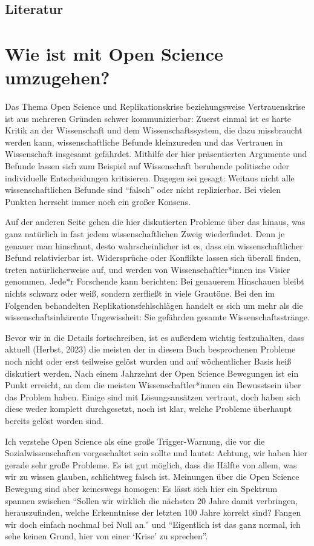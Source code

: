 \documentclass[
  letterpaper,
  DIV=11,
  numbers=noendperiod]{scrreprt}
\begin{document}
\section{Literatur}\label{literatur-2}

\chapter{Wie ist mit Open Science
umzugehen?}\label{wie-ist-mit-open-science-umzugehen}

Das Thema Open Science und Replikationskrise beziehungsweise
Vertrauenskrise ist aus mehreren Gründen schwer kommunizierbar: Zuerst
einmal ist es harte Kritik an der Wissenschaft und dem
Wissenschaftssystem, die dazu missbraucht werden kann, wissenschaftliche
Befunde kleinzureden und das Vertrauen in Wissenschaft insgesamt
gefährdet. Mithilfe der hier präsentierten Argumente und Befunde lassen
sich zum Beispiel auf Wissenschaft beruhende politische oder
individuelle Entscheidungen kritisieren. Dagegen sei gesagt: Weitaus
nicht alle wissenschaftlichen Befunde sind ``falsch'' oder nicht
replizierbar. Bei vielen Punkten herrscht immer noch ein großer Konsens.

Auf der anderen Seite gehen die hier diskutierten Probleme über das
hinaus, was ganz natürlich in fast jedem wissenschaftlichen Zweig
wiederfindet. Denn je genauer man hinschaut, desto wahrscheinlicher ist
es, dass ein wissenschaftlicher Befund relativierbar ist. Widersprüche
oder Konflikte lassen sich überall finden, treten natürlicherweise auf,
und werden von Wissenschaftler*innen ins Visier genommen. Jede*r
Forschende kann berichten: Bei genauerem Hinschauen bleibt nichts
schwarz oder weiß, sondern zerfließt in viele Grautöne. Bei den im
Folgenden behandelten Replikationsfehlschlägen handelt es sich um mehr
als die wissenschaftsinhärente Ungewissheit: Sie gefährden gesamte
Wissenschaftsstränge.

Bevor wir in die Details fortschreiben, ist es außerdem wichtig
festzuhalten, dass aktuell (Herbst, 2023) die meisten der in diesem Buch
besprochenen Probleme noch nicht oder erst teilweise gelöst wurden und
auf wöchentlicher Basis heiß diskutiert werden. Nach einem Jahrzehnt der
Open Science Bewegungen ist ein Punkt erreicht, an dem die meisten
Wissenschaftler*innen ein Bewusstsein über das Problem haben. Einige
sind mit Lösungsansätzen vertraut, doch haben sich diese weder komplett
durchgesetzt, noch ist klar, welche Probleme überhaupt bereits gelöst
worden sind.

Ich verstehe Open Science als eine große Trigger-Warnung, die vor die
Sozialwissenschaften vorgeschaltet sein sollte und lautet: Achtung, wir
haben hier gerade sehr große Probleme. Es ist gut möglich, dass die
Hälfte von allem, was wir zu wissen glauben, schlichtweg falsch ist.
Meinungen über die Open Science Bewegung sind aber keineswegs homogen:
Es lässt sich hier ein Spektrum spannen zwischen ``Sollen wir wirklich
die nächsten 20 Jahre damit verbringen, herauszufinden, welche
Erkenntnisse der letzten 100 Jahre korrekt sind? Fangen wir doch einfach
nochmal bei Null an.'' und ``Eigentlich ist das ganz normal, ich sehe
keinen Grund, hier von einer `Krise' zu sprechen''.
\end{document}
